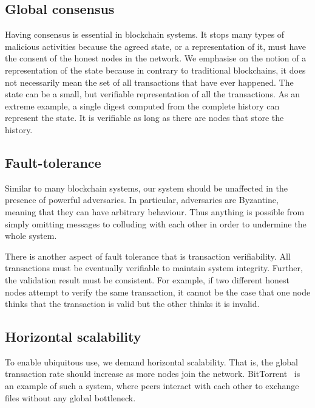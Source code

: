 \subsection*{Global consensus}
Having consensus is essential in blockchain systems.
It stops many types of malicious activities because the agreed state, or a representation of it, must have the consent of the honest nodes in the network.
We emphasise on the notion of a representation of the state because in contrary to traditional blockchains,
it does not necessarily mean the set of all transactions that have ever happened.
The state can be a small, but verifiable representation of all the transactions.
As an extreme example, a single digest computed from the complete history can represent the state.
It is verifiable as long as there are nodes that store the history.

\subsection*{Fault-tolerance}
Similar to many blockchain systems,
our system should be unaffected in the presence of powerful adversaries.
In particular, adversaries are Byzantine,
meaning that they can have arbitrary behaviour.
Thus anything is possible from simply omitting messages to colluding with each other in order to undermine the whole system.

There is another aspect of fault tolerance that is transaction verifiability.
All transactions must be eventually verifiable to maintain system integrity.
Further, the validation result must be consistent.
For example, if two different honest nodes attempt to verify the same transaction,
it cannot be the case that one node thinks that the transaction is valid but the other thinks it is invalid.

\subsection*{Horizontal scalability}

To enable ubiquitous use, we demand horizontal scalability.
That is, the global transaction rate should increase as more nodes join the network.
BitTorrent~\cite{cohen2003incentives} is an example of such a system,
where peers interact with each other to exchange files without any global bottleneck.

